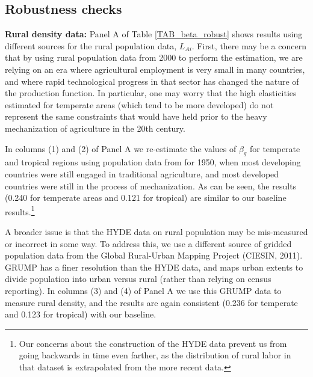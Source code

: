 \documentclass[11pt]{article}
\begin{document}
\subsection{Robustness checks}
\noindent\textbf{Rural density data:} Panel A of Table \ref{TAB_beta_robust} shows results using different sources for the rural population data, $L_{Ai}$. First, there may be a concern that by using rural population data from 2000 to perform the estimation, we are relying on an era where agricultural employment is very small in many countries, and where rapid technological progress in that sector has changed the nature of the production function. In particular, one may worry that the high elasticities estimated for temperate areas (which tend to be more developed) do not represent the same constraints that would have held prior to the heavy mechanization of agriculture in the 20th century.

In columns (1) and (2) of Panel A we re-estimate the values of $\beta_g$ for temperate and tropical regions using population data from \citet{hyde31} for 1950, when most developing countries were still engaged in traditional agriculture, and most developed countries were still in the process of mechanization. As can be seen, the results (0.240 for temperate areas and 0.121 for tropical) are similar to our baseline results.\footnote{Our concerns about the construction of the HYDE data prevent us from going backwards in time even farther, as the distribution of rural labor in that dataset is extrapolated from the more recent data.}

A broader issue is that the HYDE data on rural population may be mis-measured or incorrect in some way. To address this, we use a different source of gridded population data from the Global Rural-Urban Mapping Project (CIESIN, 2011). GRUMP has a finer resolution than the HYDE data, and maps urban extents to divide population into urban versus rural (rather than relying on census reporting). In columns (3) and (4) of Panel A we use this GRUMP data to measure rural density, and the results are again consistent (0.236 for temperate and 0.123 for tropical) with our baseline.
\end{document}
